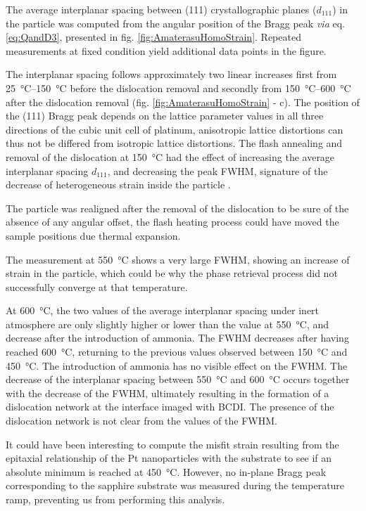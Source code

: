 {The average interplanar spacing between (111) crystallographic planes ($d_{111}$) in the particle was computed from the angular position of the Bragg peak \textit{via} eq. \ref{eq:QandD3}, presented in fig. \ref{fig:AmaterasuHomoStrain}.
Repeated measurements at fixed condition yield additional data points in the figure.

The interplanar spacing follows approximately two linear increases first from \qtyrange{25}{150}{\degreeCelsius} before the dislocation removal and secondly from \qtyrange{150}{600}{\degreeCelsius} after the dislocation removal (fig. \ref{fig:AmaterasuHomoStrain} - c).
The position of the (111) Bragg peak depends on the lattice parameter values in all three directions of the cubic unit cell of platinum, anisotropic lattice distortions can thus not be differed from isotropic lattice distortions.
The flash annealing and removal of the dislocation at \qty{150}{\degreeCelsius} had the effect of increasing the average interplanar spacing $d_{111}$, and decreasing the peak FWHM, signature of the decrease of heterogeneous strain inside the particle \parencite{Warren1990}.

The particle was realigned after the removal of the dislocation to be sure of the absence of any angular offset, the flash heating process could have moved the sample positions due thermal expansion.

The measurement at \qty{550}{\degreeCelsius} shows a very large FWHM, showing an increase of strain in the particle, which could be why the phase retrieval process did not successfully converge at that temperature.

At \qty{600}{\degreeCelsius}, the two values of the average interplanar spacing under inert atmosphere are only slightly higher or lower than the value at \qty{550}{\degreeCelsius}, and decrease after the introduction of ammonia.
The FWHM decreases after having reached \qty{600}{\degreeCelsius}, returning to the previous values observed between \qty{150}{\degreeCelsius} and \qty{450}{\degreeCelsius}.
The introduction of ammonia has no visible effect on the FWHM.
The decrease of the interplanar spacing between \qty{550}{\degreeCelsius} and \qty{600}{\degreeCelsius} occurs together with the decrease of the FWHM, ultimately resulting in the formation of a dislocation network at the interface imaged with BCDI.
The presence of the dislocation network is not clear from the values of the FWHM.

It could have been interesting to compute the misfit strain resulting from the epitaxial relationship of the Pt nanoparticles with the substrate to see if an absolute minimum is reached at \qty{450}{\degreeCelsius}.
However, no in-plane Bragg peak corresponding to the sapphire substrate was measured during the temperature ramp, preventing us from performing this analysis.

}
